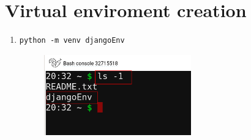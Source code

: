 \documentclass[12pt]{article}
\begin{document}
\section{Virtual enviroment creation}
	\begin{enumerate}
    \item
			\begin{lstlisting}[caption=\phantom{},style=conlst,label={lst:enter_desktop}]
python -m venv djangoEnv
			\end{lstlisting}
	\begin{figure}[H]
		\centering
		\includegraphics[width=0.6\textwidth ,keepaspectratio]{imgs/check_venv_creation.png}
		\caption{}
	\end{figure}
	\end{enumerate}
\end{document}
